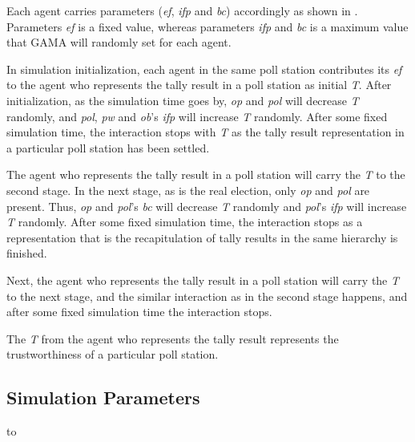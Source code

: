\documentclass[JIP]{ipsj}
\begin{document}
Each agent carries parameters (\textit{ef}, \textit{ifp} and \textit{bc}) accordingly as shown in . Parameters \textit{ef} is a fixed value, whereas parameters \textit{ifp} and \textit{bc} is a maximum value that GAMA will randomly set for each agent.

In simulation initialization, each agent in the same poll station contributes its \textit{ef} to the agent who represents the tally result in a poll station as initial \textit{T}. After initialization, as the simulation time goes by, \textit{op} and \textit{pol} will decrease \textit{T} randomly, and \textit{pol}, \textit{pw} and \textit{ob}’s \textit{ifp} will increase \textit{T} randomly. After some fixed simulation time, the interaction stops with \textit{T} as the tally result representation in a particular poll station has been settled.

The agent who represents the tally result in a poll station will carry the \textit{T} to the second stage. In the next stage, as is the real election, only \textit{op} and \textit{pol} are present. Thus, \textit{op} and \textit{pol}’s \textit{bc} will decrease \textit{T} randomly and \textit{pol}’s \textit{ifp} will increase \textit{T} randomly. After some fixed simulation time, the interaction stops as a representation that is the recapitulation of tally results in the same hierarchy is finished.

Next, the agent who represents the tally result in a poll station will carry the \textit{T} to the next stage, and the similar interaction as in the second stage happens, and after some fixed simulation time the interaction stops.

The \textit{T} from the agent who represents the tally result represents the trustworthiness of a particular poll station.


\subsection{Simulation Parameters}%

\begin{table}[tb]
\caption{Simulation Parameters}
\label{tab:simpar}
\hbox to
\end{table}
\end{document}
